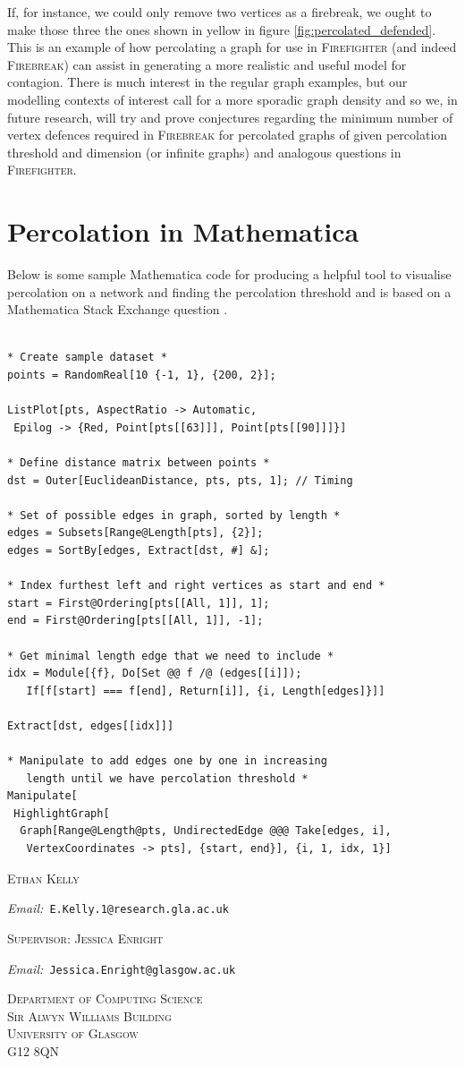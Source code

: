 \documentclass[11pt]{amsart}
\makeatletter
\newcommand{\Addresses}{{%
  \bigskip
  \footnotesize
  \textsc{Ethan Kelly} \par\nopagebreak
  	\hspace{\parindent}\textit{Email:~}\texttt{E.Kelly.1@research.gla.ac.uk}\par\nopagebreak
	\vspace{1mm}
  \textsc{Supervisor: Jessica Enright}\par\nopagebreak
  	\hspace{\parindent}\textit{Email:~}\texttt{Jessica.Enright@glasgow.ac.uk}\par\nopagebreak
	\vspace{1mm}
	\begin{flushright}
  \textsc{Department of Computing Science\\Sir Alwyn Williams Building\\University of Glasgow\\G12 8QN}
  \end{flushright}
}}
\makeatother
\begin{document}
If, for instance, we could only remove two vertices as a firebreak, we ought to make those three the ones shown in yellow in figure \ref{fig:percolated_defended}. This is an example of how percolating a graph for use in {\scshape Firefighter} (and indeed {\scshape Firebreak}) can assist in generating a more realistic and useful model for contagion. There is much interest in the regular graph examples, but our modelling contexts of interest call for a more sporadic graph density and so we, in future research, will try and prove conjectures regarding the minimum number of vertex defences required in {\scshape Firebreak} for percolated graphs of given percolation threshold and dimension (or infinite graphs) and analogous questions in {\scshape Firefighter}.

\appendix
\section{Percolation in Mathematica}
\label{apx:mathematica}
Below is some sample Mathematica code for producing a helpful tool to visualise percolation on a network and finding the percolation threshold and is based on a Mathematica Stack Exchange question \cite{mathematica17}.
\begin{verbatim}

* Create sample dataset *
points = RandomReal[10 {-1, 1}, {200, 2}];

ListPlot[pts, AspectRatio -> Automatic, 
 Epilog -> {Red, Point[pts[[63]]], Point[pts[[90]]]}]

* Define distance matrix between points *
dst = Outer[EuclideanDistance, pts, pts, 1]; // Timing

* Set of possible edges in graph, sorted by length *
edges = Subsets[Range@Length[pts], {2}];
edges = SortBy[edges, Extract[dst, #] &];

* Index furthest left and right vertices as start and end *
start = First@Ordering[pts[[All, 1]], 1];
end = First@Ordering[pts[[All, 1]], -1];

* Get minimal length edge that we need to include *
idx = Module[{f}, Do[Set @@ f /@ (edges[[i]]);
   If[f[start] === f[end], Return[i]], {i, Length[edges]}]]

Extract[dst, edges[[idx]]]

* Manipulate to add edges one by one in increasing
   length until we have percolation threshold *
Manipulate[
 HighlightGraph[
  Graph[Range@Length@pts, UndirectedEdge @@@ Take[edges, i], 
   VertexCoordinates -> pts], {start, end}], {i, 1, idx, 1}]

\end{verbatim}





\Addresses
\end{document}
